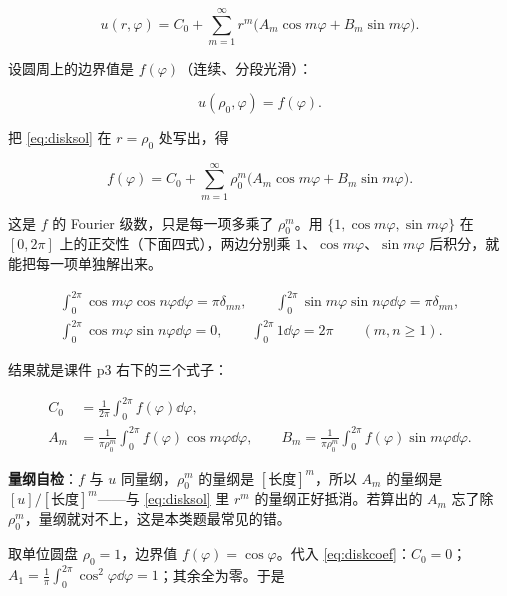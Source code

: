 \documentclass[11pt]{ctexart}
\let\origsubhdr\subhdr
\renewcommand{\subhdr}[1]{\par\needspace{3\baselineskip}\origsubhdr{#1}}
\begin{document}
\begin{equation}
u(r,\varphi)=C_0+\sum_{m=1}^{\infty}r^m\big(A_m\cos m\varphi+B_m\sin m\varphi\big).
\label{eq:disksol}
\end{equation}

设圆周上的边界值是 $f(\varphi)$（连续、分段光滑）：

\begin{equation}
u(\rho_0,\varphi)=f(\varphi).
\label{eq:diskbc}
\end{equation}

把 \eqref{eq:disksol} 在 $r=\rho_0$ 处写出，得

\[
f(\varphi)=C_0+\sum_{m=1}^{\infty}\rho_0^m\big(A_m\cos m\varphi+B_m\sin m\varphi\big).
\]

这是 $f$ 的 Fourier 级数，只是每一项多乘了 $\rho_0^m$。用 $\{1,\cos m\varphi,\sin m\varphi\}$ 在 $[0,2\pi]$ 上的正交性（下面四式），两边分别乘 $1$、$\cos m\varphi$、$\sin m\varphi$ 后积分，就能把每一项单独解出来。

\begin{gather*}
\int_0^{2\pi}\cos m\varphi\cos n\varphi\dd\varphi=\pi\delta_{mn},\qquad
\int_0^{2\pi}\sin m\varphi\sin n\varphi\dd\varphi=\pi\delta_{mn},\\
\int_0^{2\pi}\cos m\varphi\sin n\varphi\dd\varphi=0,\qquad
\int_0^{2\pi}1\dd\varphi=2\pi\qquad(m,n\ge1).
\end{gather*}

结果就是课件 p3 右下的三个式子：

\begin{equation}
\begin{aligned}
C_0&=\frac1{2\pi}\int_0^{2\pi}f(\varphi)\dd\varphi,\\
A_m&=\frac1{\pi\rho_0^m}\int_0^{2\pi}f(\varphi)\cos m\varphi\dd\varphi,\qquad
B_m=\frac1{\pi\rho_0^m}\int_0^{2\pi}f(\varphi)\sin m\varphi\dd\varphi .
\end{aligned}
\label{eq:diskcoef}
\end{equation}

\textbf{量纲自检}：$f$ 与 $u$ 同量纲，$\rho_0^m$ 的量纲是 $[\text{长度}]^m$，所以 $A_m$ 的量纲是 $[u]/[\text{长度}]^m$——与 \eqref{eq:disksol} 里 $r^m$ 的量纲正好抵消。若算出的 $A_m$ 忘了除 $\rho_0^m$，量纲就对不上，这是本类题最常见的错。


取单位圆盘 $\rho_0=1$，边界值 $f(\varphi)=\cos\varphi$。代入 \eqref{eq:diskcoef}：$C_0=0$；$A_1=\frac1\pi\int_0^{2\pi}\cos^2\varphi\dd\varphi=1$；其余全为零。于是
\end{document}
